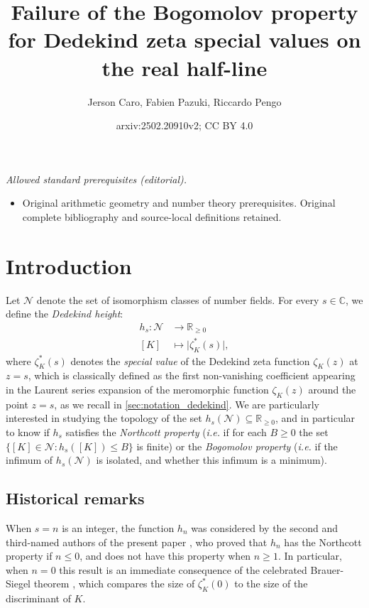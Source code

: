 \documentclass[10pt,a4paper]{amsart}
\title{Failure of the Bogomolov property for Dedekind zeta special values on the real half-line}
\author{Jerson Caro, Fabien Pazuki, Riccardo Pengo}
\date{arxiv:2502.20910v2; CC BY 4.0}
\theoremstyle{plain}
\theoremstyle{definition}
\theoremstyle{remark}
\begin{document}
\maketitle
\noindent\textit{Allowed standard prerequisites (editorial).}\begin{itemize}
\item Original arithmetic geometry and number theory prerequisites. Original complete bibliography and source-local definitions retained.
\end{itemize}\medskip
    \section{Introduction}
    
    Let $\mathcal{N}$ denote the set of isomorphism classes of number fields. For every $s \in \mathbb{C}$, we define the \textit{Dedekind height}:
    \begin{equation} \label{eq:Dedekind_height}
        \begin{aligned}
            h_s \colon \mathcal{N} &\to \mathbb{R}_{\geq 0} \\
            [K] &\mapsto \lvert \zeta_K^\ast(s) \rvert,
        \end{aligned}
    \end{equation}
    where $\zeta^\ast_K(s)$ denotes the \textit{special value} of the Dedekind zeta function $\zeta_K(z)$ at $z = s$, which is classically defined as the first non-vanishing coefficient appearing in the Laurent series expansion of the meromorphic function $\zeta_K(z)$ around the point $z = s$, as we recall in \cref{sec:notation_dedekind}.
    We are particularly interested in studying the topology of the set $h_s(\mathcal{N}) \subseteq \mathbb{R}_{\geq 0}$, and in particular to know if $h_s$ satisfies the \textit{Northcott property} (\textit{i.e.} if for each $B \geq 0$ the set $\{ [K] \in \mathcal{N} \colon h_s([K]) \leq B \}$ is finite) or the \textit{Bogomolov property} (\textit{i.e.} if the infimum of $h_s(\mathcal{N})$ is isolated, and whether this infimum is a minimum). 
    \subsection{Historical remarks}
    When $s = n$ is an integer, the function $h_n$ was considered by the second and third-named authors of the present paper \cite[Theorem~1.2]{Pazuki_Pengo_2024}, who proved that $h_n$ has the Northcott property if $n \leq 0$, and does not have this property when $n \geq 1$.
    In particular, when $n = 0$ this result is an immediate consequence of the celebrated Brauer-Siegel theorem \cite[Theorem~2]{Brauer_1947}, which compares the size of $\zeta^\ast_K(0)$ to the size of the discriminant of $K$.
\end{document}
